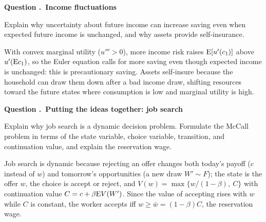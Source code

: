 \documentclass[11pt]{article}
\newcounter{qn}
\newcommand{\question}[1]{\refstepcounter{qn}\par\medskip
{\bfseries\color{ink}Question \theqn.\ #1}\par\smallskip}
\begin{document}
\question{Income fluctuations}
Explain why uncertainty about future income can increase saving even when expected future income is unchanged, and why assets provide self-insurance.

\begin{answer}
\begin{minipage}[t]{0.58\textwidth}\vspace{0pt}
With convex marginal utility ($u'''>0$), more income risk raises $\mathrm{E}[u'(c_1)]$ above $u'(\mathrm{E} c_1)$, so the Euler equation calls for more saving even though expected income is unchanged: this is precautionary saving. Assets self-insure because the household can draw them down after a bad income draw, shifting resources toward the future states where consumption is low and marginal utility is high.
\end{minipage}\hfill
\begin{minipage}[t]{0.38\textwidth}\vspace{0pt}\centering
\scalebox{0.85}{\figPrecaution}
\end{minipage}
\end{answer}

\question{Putting the ideas together: job search}
Explain why job search is a dynamic decision problem. Formulate the McCall problem in terms of the state variable, choice variable, transition, and continuation value, and explain the reservation wage.

\begin{answer}
\begin{minipage}[t]{0.58\textwidth}\vspace{0pt}
Job search is dynamic because rejecting an offer changes both today's payoff ($c$ instead of $w$) and tomorrow's opportunities (a new draw $W'\sim F$); the state is the offer $w$, the choice is accept or reject, and $V(w)=\max\{w/(1-\beta),\ C\}$ with continuation value $C=c+\beta\mathrm{E} V(W')$. Since the value of accepting rises with $w$ while $C$ is constant, the worker accepts iff $w\ge\bar w=(1-\beta)C$, the reservation wage.
\end{minipage}\hfill
\begin{minipage}[t]{0.38\textwidth}\vspace{0pt}\centering
\scalebox{0.85}{\figMcCall}
\end{minipage}
\end{answer}
\end{document}
